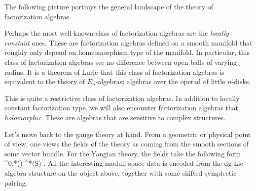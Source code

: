 \documentclass[10pt]{amsart}
\begin{document}
The following picture portrays the general landscape of the theory of factorization algebras. 
\ben
{}
\een
Perhaps the most well-known class of factorization algebras are the {\em locally constant} ones.
These are factorization algebras defined on a smooth manifold that roughly only depend on homeomorphism type of the manifold. 
In particular, this class of factorization algebras see no difference between open balls of varying radius. 
It is a theorem of Lurie \cite{LurieHA} that this class of factorization algebras is equivalent to the theory of $E_n$-algebras; algebras over the operad of little $n$-disks. 

This is quite a restrictive class of factorization algebras. 
In addition to locally constant factorization type, we will also encounter factorization algebras that {\em holomorphic}. 
These are algebras that are sensitive to complex structures. 

Let's move back to the gauge theory at hand. 
From a geometric or physical point of view, one views the fields of the theory as coming from the smooth sections of some vector bundle. 
For the Yangian theory, the fields take the following form
\ben
\Omega^{0,*}(\Sigma) \tensor \Omega^*(S) \tensor \fg[1] .
\een 
All the interesting moduli space data is encoded from the dg Lie algebra structure on the object above, together with some shifted symplectic pairing. 
\end{document}
